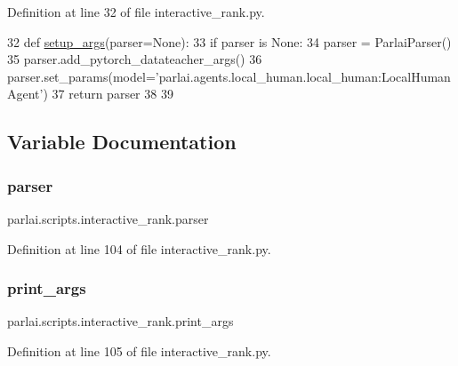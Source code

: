 Definition at line 32 of file interactive\+\_\+rank.\+py.


\begin{DoxyCode}
32 \textcolor{keyword}{def }\hyperlink{namespaceparlai_1_1scripts_1_1interactive__rank_af87c6b5d3f8843e51461c9cfd75fd510}{setup\_args}(parser=None):
33     \textcolor{keywordflow}{if} parser \textcolor{keywordflow}{is} \textcolor{keywordtype}{None}:
34         parser = ParlaiParser()
35     parser.add\_pytorch\_datateacher\_args()
36     parser.set\_params(model=\textcolor{stringliteral}{'parlai.agents.local\_human.local\_human:LocalHumanAgent'})
37     \textcolor{keywordflow}{return} parser
38 
39 
\end{DoxyCode}


\subsection{Variable Documentation}
\mbox{\label{namespaceparlai_1_1scripts_1_1interactive__rank_a69b6e90931629e4bb38cdd3ca8f6fd38}} 
\subsubsection{\texorpdfstring{parser}{parser}}
{\footnotesize\ttfamily parlai.\+scripts.\+interactive\+\_\+rank.\+parser}



Definition at line 104 of file interactive\+\_\+rank.\+py.

\mbox{\label{namespaceparlai_1_1scripts_1_1interactive__rank_a1c1bdd9d0f64903e7167d0f6d3f780ef}} 
\subsubsection{\texorpdfstring{print\+\_\+args}{print\_args}}
{\footnotesize\ttfamily parlai.\+scripts.\+interactive\+\_\+rank.\+print\+\_\+args}



Definition at line 105 of file interactive\+\_\+rank.\+py.

